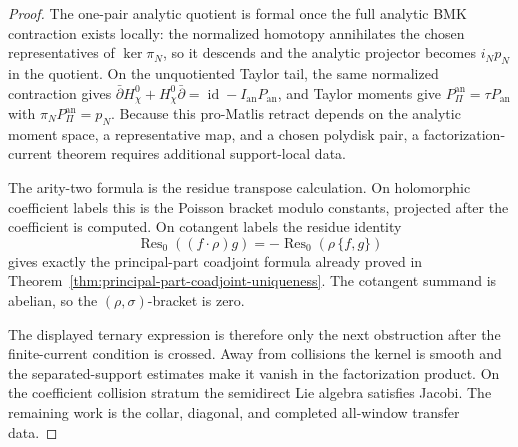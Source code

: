 \documentclass[11pt]{memoir}
\begin{document}
\begin{proof}
  The one-pair analytic quotient is formal once the full analytic BMK
  contraction exists locally: the normalized homotopy annihilates
  the chosen representatives of \(\ker\pi_N\), so it descends and the
  analytic projector becomes \(i_Np_N\) in the quotient.  On the
  unquotiented Taylor tail, the same normalized contraction gives
  \(\bar\partial H_\chi^0+H_\chi^0\bar\partial
  =\operatorname{id}-I_{\mathrm{an}}P_{\mathrm{an}}\), and Taylor
  moments give \(P_{\Pi}^{\mathrm{an}}=\tau P_{\mathrm{an}}\) with
  \(\pi_NP_{\Pi}^{\mathrm{an}}=p_N\).  Because this pro-Matlis retract
  depends on the analytic moment space, a representative map, and a
  chosen polydisk pair, a factorization-current theorem requires
  additional support-local data.

  The arity-two formula is the residue transpose calculation.  On
  holomorphic coefficient labels this is the Poisson bracket modulo
  constants, projected after the coefficient is computed.  On cotangent
  labels the residue identity
  \[
    \operatorname{Res}_0((f\cdot\rho)g)
      =
      -\operatorname{Res}_0(\rho\,\{f,g\})
  \]
  gives exactly the principal-part coadjoint formula already proved in
  Theorem~\ref{thm:principal-part-coadjoint-uniqueness}.  The cotangent
  summand is abelian, so the \((\rho,\sigma)\)-bracket is zero.

  The displayed ternary expression is therefore only the next obstruction
  after the finite-current condition is crossed.  Away from collisions the
  kernel is smooth and the separated-support estimates make it vanish
  in the factorization product.  On the coefficient collision stratum the
  semidirect Lie algebra satisfies Jacobi.  The remaining work is the
  collar, diagonal, and completed all-window transfer data.
\end{proof}
\end{document}

